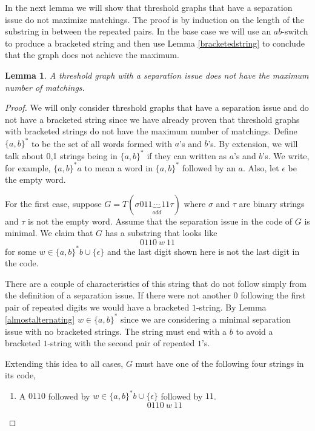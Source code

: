 \documentclass[12pt]{amsart}
\theoremstyle{plain}
\newtheorem{lem}[thm]{Lemma}
\theoremstyle{definition}
\begin{document}
In the next lemma we will show that threshold graphs that have a separation issue do not maximize matchings.  The proof is by induction on the length of the substring in between the repeated pairs.  In the base case we will use an $ab$-switch to produce a bracketed string and then use Lemma \ref{bracketedstring} to conclude that the graph does not achieve the maximum.

\begin{lem} 
\label{separationissue} A threshold graph with a separation issue does not have the maximum number of matchings.
\end{lem}
\begin{proof}
We will only consider threshold graphs that have a separation issue and do not have a bracketed string since we have already proven that threshold graphs with bracketed strings do not have the maximum number of matchings. 
Define $\{a,b\}^*$ to be the set of all words formed with $a$'s and $b$'s.  By extension, we will talk about 0,1 strings being in $\{a,b\}^*$  if they can written as $a$'s and $b$'s.  We write, for example, $\{a,b\}^*a$ to mean a word in $\{a,b\}^*$ followed by an $a$.  Also, let $\epsilon$ be the empty word. 
   
  For the first case, suppose $G=T(\sigma 011 \underbrace{\cdots}_{odd} 11\tau)$ where $\sigma$ and $\tau$ are binary strings and $\tau$ is not the empty word.  Assume that the separation issue in the code of $G$ is minimal.  
  We claim that $G$ has a substring that looks like
   $$0110~w ~11$$
   for some $w\in\{a,b\}^*b\cup\{\epsilon\}$
   and the last digit shown here is not the last digit in the code.  
   
There are a couple of characteristics of this string that do not follow simply from the definition of a separation issue.  If there were not another $0$ following the first pair of repeated digits we would have a bracketed $1$-string.  By Lemma \ref{almostalternating} $w\in\{a,b\}^*$ since we are considering a minimal separation issue with no bracketed strings. %
The string must end with a $b$ to avoid a bracketed $1$-string with the second pair of repeated $1$'s.    
  
   Extending this idea to all cases, $G$ must have one of the following four strings in its code, %
\begin{enumerate}
\item  A $0110$ followed by $w\in\{a,b\}^*b\cup \{\epsilon\}$ followed by $11$.
$$0110~w~11$$



\end{enumerate}
\end{proof}
\end{document}
